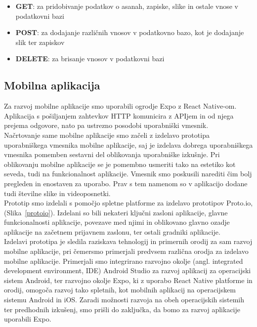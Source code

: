 \documentclass[a4paper, 12pt]{book}
\begin{document}
 \begin{itemize}
  \item \textbf{GET}: za pridobivanje podatkov o asanah, zapiske, slike in ostale vnose v podatkovni bazi
  \item \textbf{POST}: za dodajanje različnih vnosov v podatkovno bazo, kot je dodajanje slik ter zapiskov
  \item \textbf{DELETE}: za brisanje vnosov v podatkovni bazi
\end{itemize}

\subsection{Mobilna aplikacija}
Za razvoj mobilne aplikacije smo uporabili ogrodje Expo z React Native-om. Aplikacija s pošiljanjem zahtevkov HTTP komunicira z APIjem in od njega prejema odgovore, nato pa ustrezno posodobi uporabniški vmesnik.\\

Načrtovanje same mobilne aplikacije smo začeli z izdelavo prototipa uporabniškega vmesnika mobilne aplikacije, saj je izdelava dobrega uporabniškega vmesnika pomemben sestavni del oblikovanja uporabniške izkušnje. Pri oblikovanju mobilne aplikacije se je pomembno usmeriti tako na estetiko kot seveda, tudi na funkcionalnost aplikacije. Vmesnik smo poskusili narediti čim bolj pregleden in enostaven za uporabo. Prav s tem namenom so v aplikacijo dodane tudi številne slike in videoposnetki.\\

Prototip smo izdelali s pomočjo spletne platforme za izdelavo prototipov Proto.io, (Slika~\ref{protoio}). Izdelani so bili nekateri ključni zasloni aplikacije, glavne funkcionalnosti aplikacije, povezave med njimi in oblikovano glavno ozadje aplikacije na začetnem prijavnem zaslonu, ter ostali gradniki aplikacije.\\

Izdelavi prototipa je sledila raziskava tehnologij in primernih orodij za sam razvoj mobilne aplikacije, pri čemersmo primerjali predvsem različna orodja za izdelavo mobilne aplikacije. Primerjali smo integrirano razvojno okolje (angl. integrated development environment, IDE) Android Studio za razvoj aplikacij za operacijski sistem Android, ter razvojno okolje Expo, ki z uporabo React Native platforme in orodij, omogoča razvoj tako spletnih, kot mobilnih aplikacij na operacijskem sistemu Android in iOS. Zaradi možnosti razvoja na obeh operacijskih sistemih ter predhodnih izkušenj, smo prišli do zaključka, da bomo za razvoj aplikacije uporabili Expo.\\
\end{document}

